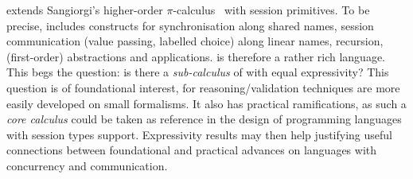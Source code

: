  

  \HOp %
extends Sangiorgi's higher-order $\pi$-calculus~\cite{SangiorgiD:expmpa} with session primitives.
To be precise, %
\HOp
includes
constructs for 
synchronisation along shared names, 
session communication (value passing, labelled choice) along linear names,
recursion, 
 (first-order) abstractions %
 and applications.
\HOp is therefore a rather rich language. This begs the question:
is there a \emph{sub-calculus} of \HOp with equal expressivity? %
This question is of foundational interest, 
for reasoning/validation techniques are more easily developed on small formalisms. 
It also has practical ramifications, 
as such a \emph{core calculus} could be taken as reference in 
the design of %
programming languages with session types support.
Expressivity results may then help justifying useful connections 
between foundational and practical advances on languages with concurrency and communication.



